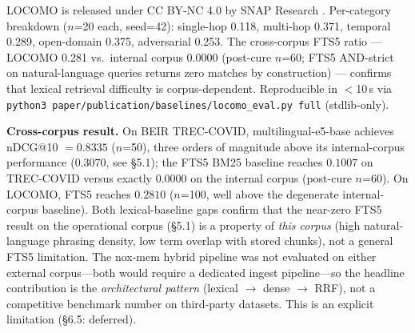 \begin{table}[t]
  \caption{Cross-corpus nDCG@10 --- LOCOMO conversational memory benchmark (Maharana
    et al.\ 2024, 5{,}882 dialogue turns from 10 long conversations, $n$=100 stratified
    subset, seed=42).}
  \label{tab:locomo}
  \centering
  \begin{minipage}{\linewidth}
    \vspace{4pt}\footnotesize
    LOCOMO is released under CC BY-NC 4.0 by SNAP Research \cite{maharana2024locomo}.
    Per-category breakdown ($n$=20 each, seed=42): single-hop 0.118, multi-hop 0.371,
    temporal 0.289, open-domain 0.375, adversarial 0.253. The cross-corpus FTS5 ratio ---
    LOCOMO 0.281 vs.\ internal corpus 0.0000 (post-cure $n$=60; FTS5 AND-strict on natural-language queries returns zero matches by construction) --- confirms that
    lexical retrieval difficulty is corpus-dependent. Reproducible in $<$10\,s via
    \texttt{python3 paper/publication/baselines/locomo\_eval.py full} (stdlib-only).
  \end{minipage}
\end{table}

\textbf{Cross-corpus result.} On BEIR TREC-COVID, multilingual-e5-base achieves
nDCG@10 $= 0.8335$ ($n$=50), three orders of magnitude above its internal-corpus
performance ($0.3070$, see \S5.1); the FTS5 BM25 baseline reaches $0.1007$ on TREC-COVID
versus exactly $0.0000$ on the internal corpus (post-cure $n$=60). On LOCOMO, FTS5 reaches $0.2810$ ($n$=100, well above the degenerate internal-corpus baseline).
Both lexical-baseline gaps confirm that the near-zero FTS5 result on the operational
corpus (\S5.1) is a property of \emph{this corpus} (high natural-language phrasing
density, low term overlap with stored chunks), not a general FTS5 limitation. The
nox-mem hybrid pipeline was not evaluated on either external corpus---both would
require a dedicated ingest pipeline---so the headline contribution is the
\emph{architectural pattern} (lexical $\to$ dense $\to$ RRF), not a competitive
benchmark number on third-party datasets. This is an explicit limitation
(\S6.5: deferred).

